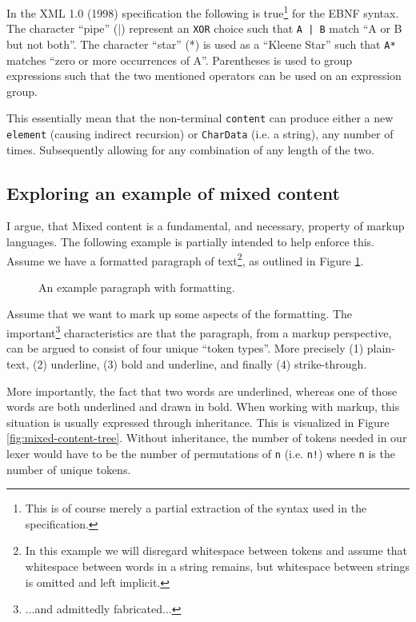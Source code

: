 \documentclass{scrreprt}
\begin{document}
In the XML 1.0 (1998) specification the following is true\footnote{This is of course merely a partial extraction of the syntax used in the specification.} for the EBNF syntax. The character ``pipe'' (|) represent an \texttt{XOR} choice such that \texttt{A | B} match ``A or B but not both''. The character ``star'' (*) is used as a ``Kleene Star'' such that \texttt{A*} matches ``zero or more occurrences of A''. Parentheses is used to group expressions such that the two mentioned operators can be used on an expression group.

This essentially mean that the non-terminal \texttt{content} can produce either a new \texttt{element} (causing indirect recursion) or \texttt{CharData} (i.e. a string), any number of times. Subsequently allowing for any combination of any length of the two.



\subsection{Exploring an example of mixed content}
I argue, that Mixed content is a fundamental, and necessary, property of markup languages. The following example is partially intended to help enforce this. Assume we have a formatted paragraph of text\footnote{In this example we will disregard whitespace between tokens and assume that whitespace between words in a string remains, but whitespace between strings is omitted and left implicit.}, as outlined in Figure \ref{fig:mixed-content-paragraph}.


\begin{figure}[h]
\centering
{}
\caption{An example paragraph with formatting.}
\label{fig:mixed-content-paragraph}
\end{figure}


Assume that we want to mark up some aspects of the formatting. The important\footnote{...and admittedly fabricated...} characteristics are that the paragraph, from a markup perspective, can be argued to consist of four unique ``token types''. More precisely (1) plain-text, (2) underline, (3) bold and underline, and finally (4) strike-through.


More importantly, the fact that two words are underlined, whereas one of those words are both underlined and drawn in bold. When working with markup, this situation is usually expressed through inheritance. This is visualized in Figure \ref{fig:mixed-content-tree}. Without inheritance, the number of tokens needed in our lexer would have to be the number of permutations of \texttt{n} (i.e. \texttt{n!}) where \texttt{n} is the number of unique tokens.
\end{document}
